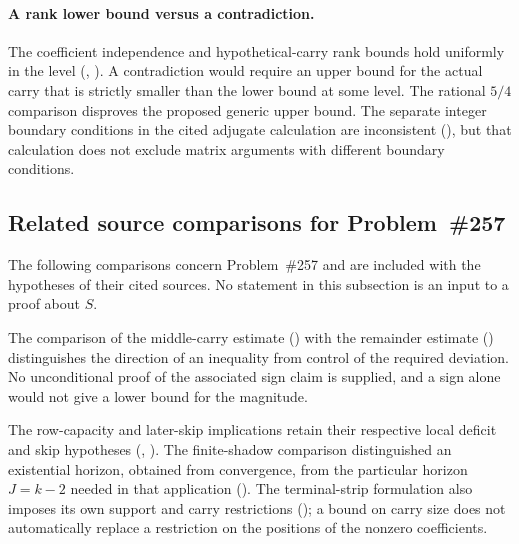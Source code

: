 \paragraph{A rank lower bound versus a contradiction.}
The coefficient independence and hypothetical-carry rank bounds hold
uniformly in the level
(, ).
A contradiction would require an upper bound for the actual carry that
is strictly smaller than the lower bound at some level. The rational
$5/4$ comparison disproves the proposed generic upper bound. The separate integer boundary conditions in the cited
adjugate calculation are inconsistent
(), but that calculation does not exclude matrix arguments
with different boundary conditions.

\subsection*{Related source comparisons for Problem~\#257}

The following comparisons concern Problem~\#257 and are included
with the hypotheses of their cited sources. No statement in this
subsection is an input to a proof about $S$.

The comparison of the middle-carry estimate
() with the remainder estimate
() distinguishes the direction of an inequality from control
of the required deviation. No unconditional proof of the associated sign
claim is supplied, and a sign alone would not give a lower bound for the
magnitude.

The row-capacity and later-skip implications retain their respective
local deficit and skip hypotheses
(, ).
The finite-shadow comparison distinguished an existential horizon,
obtained from convergence, from the particular horizon $J=k-2$
needed in that application
().
The terminal-strip formulation also imposes its own support and carry
restrictions
(); a bound on carry size does not automatically replace a
restriction on the positions of the nonzero coefficients.

